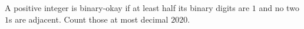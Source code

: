 A positive integer is binary-okay if at least half its binary digits are $1$ and no two $1$s are adjacent. Count those at most decimal $2020$.
